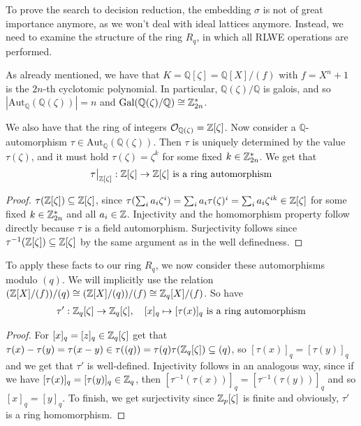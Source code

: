 
\label{structure_rq}
To prove the search to decision reduction, the embedding $\sigma$ is not of great importance anymore, as we won't deal with ideal lattices anymore. Instead, we need to examine the structure of the ring $R_q$, in which all RLWE operations are performed.

As already mentioned, we have that $K = \mathbb{Q}[\zeta] = \mathbb{Q}[X] / (f)$ with $f = X^n + 1$ is the $2n$-th cyclotomic polynomial. In particular, $\mathbb{Q}(\zeta)/\mathbb{Q}$ is galois, and so $|\mathrm{Aut}_\mathbb{Q}(\mathbb{Q}(\zeta))| = n$ and $\mathrm{Gal}(\mathbb{Q}(\zeta)/\mathbb{Q}) \cong \mathbb{Z}_{2n}^*$.

We also have that the ring of integers $\mathcal{O}_{\mathbb{Q}(\zeta)} = \mathbb{Z}[\zeta]$. Now consider a $\mathbb{Q}$-automorphism $\tau \in \mathrm{Aut}_\mathbb{Q}(\mathbb{Q}(\zeta))$. Then $\tau$ is uniquely determined by the value $\tau(\zeta)$, and it must hold $\tau(\zeta) = \zeta^k$ for some fixed $k \in \mathbb{Z}_{2n}^*$. We get that
\begin{equation}
\begin{split}
\restr{\tau}{\Z[\zeta]}: \Z[\zeta] \to \Z[\zeta] \text{ is a ring automorphism}
\end{split}\nonumber
\end{equation}
\begin{proof}
$\tau(\mathbb{Z}[\zeta]) \subseteq \mathbb{Z}[\zeta]$, since $\tau(\sum_i a_i \zeta^i) = \sum_i a_i \tau(\zeta)^i = \sum_i a_i \zeta^{ik} \in \mathbb{Z}[\zeta]$ for some fixed $k \in \mathbb{Z}_{2n}^*$ and all $a_i \in \mathbb{Z}$. Injectivity and the homomorphism property follow directly because $\tau$ is a field automorphism. Surjectivity follows since $\tau^{-1}(\mathbb{Z}[\zeta]) \subseteq \mathbb{Z}[\zeta]$ by the same argument as in the well definedness. \qedhere
\end{proof}

To apply these facts to our ring $R_q$, we now consider these automorphisms modulo $(q)$. We will implicitly use the relation $(\mathbb{Z}[X]/(f))/(q) \cong (\mathbb{Z}[X]/(q))/(f) \cong \mathbb{Z}_q[X]/(f)$. So have
\begin{equation}
\begin{split}
\tau' : \mathbb{Z}_q[\zeta] \to \mathbb{Z}_q[\zeta], \quad [x]_q \mapsto [\tau(x)]_q \text{ is a ring automorphism}
\end{split}\nonumber
\end{equation}
\begin{proof}
For $[x]_q = [z]_q \in \mathbb{Z}_q[\zeta]$ get that $\tau(x) - \tau(y) = \tau(x - y) \in \tau((q)) = \tau(q) \tau(\mathbb{Z}_q[\zeta]) \subseteq (q)$, so $[\tau(x)]_q = [\tau(y)]_q$ and we get that $\tau'$ is well-defined. Injectivity follows in an analogous way, since if we have $[\tau(x)]_q = [\tau(y)]_q \in \mathbb{Z}_q$, then $[\tau^{-1}(\tau(x))]_q = [\tau^{-1}(\tau(y))]_q$ and so $[x]_q = [y]_q$. To finish, we get surjectivity since $\mathbb{Z}_p[\zeta]$ is finite and obviously, $\tau'$ is a ring homomorphism. \qedhere
\end{proof}

